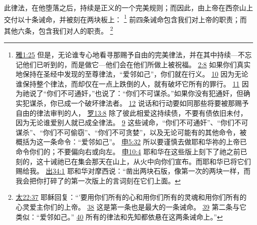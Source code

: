 \documentclass[12pt, a4paper, oneside]{ctexart}
\newcounter{parnum}[section]
\newcommand{\N}{%
   \noindent\refstepcounter{parnum}%
    \makebox[\parindent][l]{\textbf{\arabic{parnum}.}}}
\begin{document}
\N 此律法，在他堕落之后，持续是正义的一个完美规则；而因此，由上帝在西奈山上交付以十条诫命，并被刻在两块板上：
	\footnote {
		\href{https://biblehub.com/james/1-25.htm}{雅1:25} 但是，无论谁专心地看寻那赐予自由的完美律法，并在其中持续---不忘记他们已听到的，而是做它---他们会在他们所做上被祝福。
		\href{https://biblehub.com/james/2-8.htm}{2:8} 如果你们真实地保持在圣经中发现的至尊律法，“爱邻如己”，你们就在行义。
		\href{https://biblehub.com/james/2-10.htm}{10} 因为无论谁保持整个律法，而却仅在一点上跌倒的人，就有破坏它所有的罪行。
		\href{https://biblehub.com/james/2-11.htm}{11} 因为祂说了“你们不可通奸，”也说了：“你们不可谋杀。”如果你没有犯通奸，但确实犯谋杀，你已成一个破坏律法者。
		\href{https://biblehub.com/james/2-12.htm}{12} 说话和行动要如同那些将要被那赐予自由的律法审判的人，
        \href{https://biblehub.com/romans/13-8.htm}{罗13:8} 除了彼此相爱这持续债，不要有债依旧未付，因为无论谁爱别人就已成全律法。
		\href{https://biblehub.com/romans/13-9.htm}{9} 这些诫命，“你们不可通奸”、“你们不可谋杀”、“你们不可偷窃”、“你们不可贪婪”，以及无论可能有的其他命令，被概括为这一条命令：“爱邻如己”。
		\href{https://biblehub.com/deuteronomy/5-32.htm}{申5:32} 所以要谨慎去做耶和华祢的上帝已命令你们的；不要偏向右或向左。
		\href{https://biblehub.com/deuteronomy/10-4.htm}{申10:4} 耶和华在这些版上刻下了祂之前已刻的，这十诫祂已在集会那天在山上，从火中向你们宣布。而耶和华已将它们赐给我。
        \href{https://biblehub.com/exodus/34-1.htm}{出34:1} 耶和华对摩西说：“凿出两块石版，像第一次的两块一样，而我会把你打碎了的第一次版上的言词刻在它们上面。
	}
	前四条诫命包含我们对上帝的职责；而其他六条，包含我们对人的职责。
	\footnote {
		\href{https://biblehub.com/matthew/22-37.htm}{太22:37} 耶稣回复：“'要用你们所有的心和用你们所有的灵魂和用你们所有的心灵爱主你们的上帝。
		\href{https://biblehub.com/matthew/22-38.htm}{38} 这是第一条也是最大的一条诫命。
		\href{https://biblehub.com/matthew/22-39.htm}{39} 第二条与它类似：“爱邻如己。”
		\href{https://biblehub.com/matthew/22-40.htm}{40} 所有的律法和先知都依悬在这两条诫命上。”
	}
\end{document}
